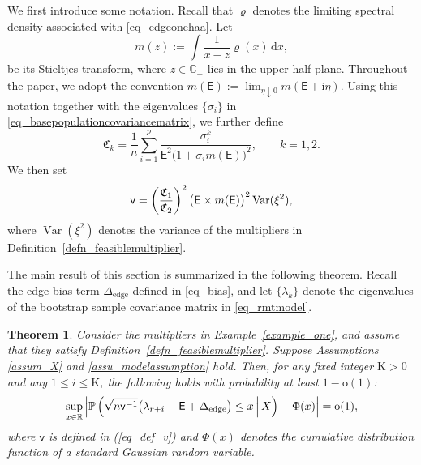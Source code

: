 \documentclass[12pt]{article}
\theoremstyle{plain}
\newtheorem{theorem}{Theorem}[section]
\numberwithin{equation}{section}
\begin{document}
We first introduce some notation. Recall that $\varrho$ denotes the limiting spectral density associated with \eqref{eq_edgeonehaa}. Let
\begin{equation*}
	m(z):=\int \frac{1}{x-z}\varrho(x)\,\mathrm{d}x,
\end{equation*}
be its Stieltjes transform, where $z\in\mathbb C_+$ lies in the upper half-plane. Throughout the paper, we adopt the convention $m(\mathsf E):=\lim_{\eta\downarrow 0}m(\mathsf E+\mathrm{i}\eta).$ Using this notation together with the eigenvalues $\{\sigma_i\}$ in \eqref{eq_basepopulationcovariancematrix}, we further define
\begin{equation*}
	\mathfrak C_k
	=
	\frac{1}{n}\sum_{i=1}^p
	\frac{\sigma_i^k}{\mathsf E^2\bigl(1+\sigma_i m(\mathsf E)\bigr)^2},
	\qquad k=1,2.
\end{equation*}
We then set \vspace*{-10pt}
\begin{equation}\label{eq_def_v}
	\vspace*{-10pt}
	\mathsf v
	=
	\left(\frac{\mathfrak C_1}{\mathfrak C_2}\right)^2
	\bigl(\mathsf E \times m(\mathsf E)\bigr)^2
	\operatorname{Var}(\xi^2),
\end{equation}
where $\operatorname{Var}(\xi^2)$ denotes the variance of the multipliers in Definition~\ref{defn_feasiblemultiplier}.


The main result of this section is summarized in the following theorem. Recall the edge bias term $\Delta_{\mathrm{edge}}$ defined in \eqref{eq_bias}, and let $\{\lambda_k\}$ denote the eigenvalues of the bootstrap sample covariance matrix in \eqref{eq_rmtmodel}.
\begin{theorem}\label{thm_boostrapmain}
	Consider the multipliers in Example~\ref{example_one}, and assume that they satisfy Definition~\ref{defn_feasiblemultiplier}. Suppose Assumptions \ref{assum_X} and \ref{assu_modelassumption} hold. Then, for any fixed integer $\mathrm{K}>0$ and any $1\le i\le \mathrm{K}$, the following holds with probability at least $1-\mathrm{o}(1)$: \vspace*{-10pt}
	\begin{equation*}
		\vspace*{-10pt}
		\sup_{x\in\mathbb{R}}
		\left|
		\mathbb{P}
		\left(
		\sqrt{n\mathsf{v}^{-1}}
		\bigl(\lambda_{r+i}-\mathsf{E}+\Delta_{\mathrm{edge}}\bigr)
		\le x
		\,\middle|\, X
		\right)
		-\Phi(x)
		\right|
		=
		\mathrm{o}(1),
	\end{equation*}
	where $\mathsf{v}$ is defined in (\ref{eq_def_v}) and $\Phi(x)$ denotes the cumulative distribution function of a standard Gaussian random variable.
\end{theorem}
\end{document}
